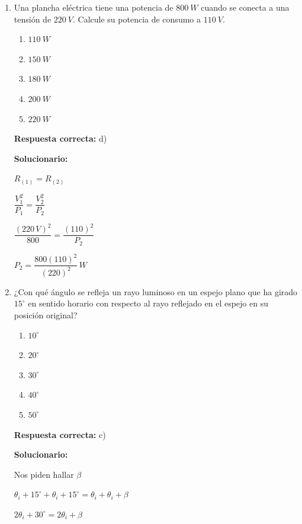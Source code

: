 \begin{enumerate}[resume]
	$Q_t=Q_f+Q$
	
	$\Rightarrow L_f\,m+mc\,(T_f-T_i)$
	
	$\Rightarrow \left(80\dfrac{\text{cal}}{g}\right)(500\,g)+\left(500\,g\right)\left(1\dfrac{\text{cal}}{g^\circ C}\right)(20-0)^\circ C$
	
	$\Rightarrow (40,000+10,000)\,\text{cal}$
	
	$=50,000\,\text{cal}=$
	
	\vspace{6mm}
	
	\item Una plancha eléctrica tiene una potencia de $800\ W$ cuando se conecta a una tensión de $220\ V$. Calcule su potencia de consumo a $110\ V$.
	
	\begin{enumerate}[label=\alph*)]
		\item $110\ W$
		\item $150\ W$
		\item $180\ W$
		\item $200\ W$
		\item $220\ W$
	\end{enumerate}
	\textbf{Respuesta correcta:} d)
	
	\vspace{2mm}
	\textbf{Solucionario:}
	
	$R_{(1)}=R_{(2)}$
	
	$\dfrac{V_1^2}{P_1}=\dfrac{V_2^2}{P_2}$
	
	$\dfrac{(220\,V)^2}{800}=\dfrac{(110)^2}{P_2}$
	
	$P_2=\dfrac{800(110)^2}{(220)^2}\,W$
	
	
	\vspace{6mm}
	
	\item ¿Con qué ángulo se refleja un rayo luminoso en un espejo plano que ha girado $15^\circ$ en sentido horario con respecto al rayo reflejado en el espejo en su posición original?
	
	\begin{enumerate}[label=\alph*)]
		\item $10^\circ$
		\item $20^\circ$
		\item $30^\circ$
		\item $40^\circ$
		\item $50^\circ$
	\end{enumerate}
	\textbf{Respuesta correcta:} c)
	
	\vspace{2mm}
	\textbf{Solucionario:}
	
	Nos piden hallar $\beta$
	
	$\theta_i+15^\circ+\theta_i+15^\circ=\theta_i+\theta_i+\beta$
	
	$2\theta_i+30^\circ=2\theta_i+\beta$
	
	
	\vspace{6mm}
	
\end{enumerate}




